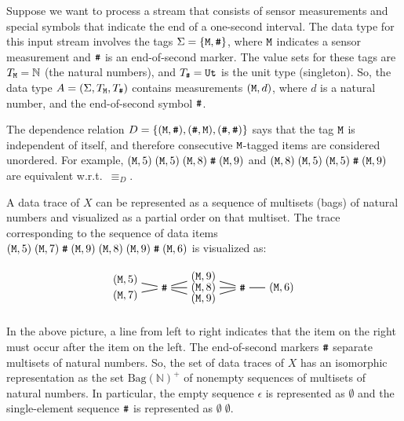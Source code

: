 \begin{example}
\label{45:ex:data-trace}
Suppose we want to process a stream that consists of sensor measurements and special symbols that indicate the end of a one-second interval. The data type for this input stream involves the tags $\Sigma = \{ \texttt{M}, \texttt{\#} \}$, where $\texttt{M}$ indicates a sensor measurement and $\texttt{\#}$ is an end-of-second marker. The value sets for these tags are $T_{\texttt{M}} = \mathbb{N}$ (the natural numbers), and $T_{\texttt{\#}} = \mathtt{Ut}$ is the unit type (singleton). So, the data type $A = (\Sigma,T_{\texttt{M}},T_{\texttt{\#}})$ contains measurements $(\texttt{M}, d)$, where $d$ is a natural number, and the end-of-second symbol $\texttt{\#}$.

The dependence relation $D = \{ (\texttt{M}, \texttt{\#}), (\texttt{\#}, \texttt{M}), (\texttt{\#},\texttt{\#}) \}$ says that the tag $\texttt{M}$ is independent of itself, and therefore consecutive $\texttt{M}$-tagged items are considered unordered. For example, $(\texttt{M}, 5) \; (\texttt{M}, 5) \; (\texttt{M}, 8) \; \texttt{\#} \; (\texttt{M}, 9)$ and $(\texttt{M}, 8) \; (\texttt{M}, 5) \; (\texttt{M}, 5) \; \texttt{\#} \; (\texttt{M}, 9)$ are equivalent w.r.t.\ $\equiv_D$.

A data trace of $X$ can be represented as a sequence of multisets (bags) of natural numbers and visualized as a partial order on that multiset. The trace corresponding to the sequence of data items
$
  (\texttt{M}, 5) \; (\texttt{M}, 7) \; \texttt{\#} \; (\texttt{M}, 9) \; (\texttt{M}, 8) \; (\texttt{M}, 9) \; \texttt{\#} \; (\texttt{M}, 6)
$
is visualized as:

\[
\begin{tikzpicture}[-, >=to, auto, node distance=1.25cm, semithick, transform shape]
\node (M1) {};
\node (T1) [above of=M1, node distance=0.25cm] {$(\tg M,5)$};
\node (B1) [below of=M1, node distance=0.25cm] {$(\tg M,7)$};
\node (M2) [right of=M1] {$\tg\#$};
\node (M3) [right of=M2] {$(\tg M,8)$};
\node (T3) [above of=M3, node distance=0.35cm] {$(\tg M,9)$};
\node (B3) [below of=M3, node distance=0.35cm] {$(\tg M,9)$};
\node (M4) [right of=M3] {$\tg\#$};
\node (M5) [right of=M4] {$(\tg M,6)$};

\path (T1) edge (M2);
\path (B1) edge (M2);
\path (M2) edge (T3);
\path (M2) edge (M3);
\path (M2) edge (B3);
\path (T3) edge (M4);
\path (M3) edge (M4);
\path (B3) edge (M4);
\path (M4) edge (M5);
\end{tikzpicture}
\]

In the above picture, a line from left to right indicates that the item on the right must occur after the item on the left. The end-of-second markers $\texttt{\#}$ separate multisets of natural numbers. So, the set of data traces of $X$ has an isomorphic representation as the set $\text{Bag}(\mathbb{N})^+$ of nonempty sequences of multisets of natural numbers. In particular, the empty sequence $\epsilon$ is represented as $\emptyset$ and the single-element sequence $\texttt{\#}$ is represented as $\emptyset \; \emptyset$.
\end{example}

